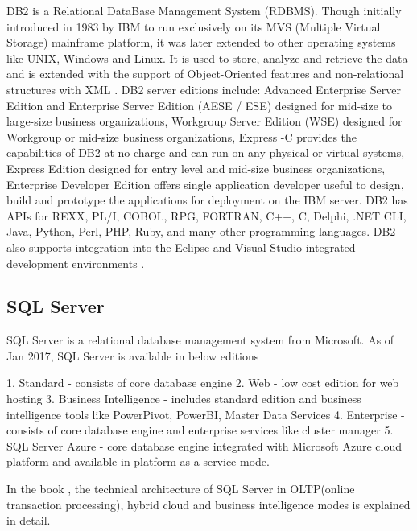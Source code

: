      DB2 is a Relational DataBase Management System (RDBMS). Though
     initially introduced in 1983 by IBM to run exclusively on its MVS
     (Multiple Virtual Storage) mainframe platform, it was later
     extended to other operating systems like UNIX, Windows and
     Linux. It is used to store, analyze and retrieve the data and is
     extended with the support of Object-Oriented features and
     non-relational structures with XML \cite{www-DB2Intro}. DB2
     server editions include: Advanced Enterprise Server Edition and
     Enterprise Server Edition (AESE / ESE) designed for mid-size to
     large-size business organizations, Workgroup Server Edition (WSE)
     designed for Workgroup or mid-size business organizations,
     Express -C provides the capabilities of DB2 at no charge and can
     run on any physical or virtual systems, Express Edition designed
     for entry level and mid-size business organizations, Enterprise
     Developer Edition offers single application developer useful to
     design, build and prototype the applications for deployment on
     the IBM server. DB2 has APIs for REXX, PL/I, COBOL, RPG, FORTRAN,
     C++, C, Delphi, .NET CLI, Java, Python, Perl, PHP, Ruby, and many
     other programming languages. DB2 also supports integration into
     the Eclipse and Visual Studio integrated development environments
     \cite{www-DB2Wiki}.

\subsection{SQL Server}

     SQL Server \cite{www-sqlserver-wiki} is a relational database
     management system from Microsoft. As of Jan 2017, SQL Server is
     available in below editions

     1. Standard - consists of core database engine
     2. Web - low cost edition for web hosting
     3. Business Intelligence - includes standard edition and business
        intelligence tools like PowerPivot, PowerBI, Master Data Services
     4. Enterprise - consists of core database engine and enterprise services
        like cluster manager
     5. SQL Server Azure - \cite{www-azuresql} core database engine
        integrated with Microsoft Azure cloud platform and available in
        platform-as-a-service mode.

     In the book \cite{book-sqlserver}, the technical architecture of
     SQL Server in OLTP(online transaction processing), hybrid cloud
     and business intelligence modes is explained in detail.



